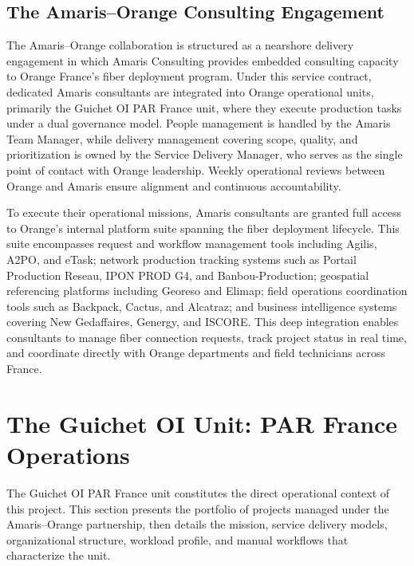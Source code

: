 \subsection{The Amaris--Orange Consulting Engagement}

The Amaris--Orange collaboration is structured as a nearshore delivery engagement in which Amaris Consulting provides embedded consulting capacity to Orange France's fiber deployment program. Under this service contract, dedicated Amaris consultants are integrated into Orange operational units, primarily the Guichet OI PAR France unit, where they execute production tasks under a dual governance model. People management is handled by the Amaris Team Manager, while delivery management covering scope, quality, and prioritization is owned by the Service Delivery Manager, who serves as the single point of contact with Orange leadership. Weekly operational reviews between Orange and Amaris ensure alignment and continuous accountability.

To execute their operational missions, Amaris consultants are granted full access to Orange's internal platform suite spanning the fiber deployment lifecycle. This suite encompasses request and workflow management tools including Agilis, A2PO, and eTask; network production tracking systems such as Portail Production Reseau, IPON PROD G4, and Banbou-Production; geospatial referencing platforms including Georeso and Elimap; field operations coordination tools such as Backpack, Cactus, and Alcatraz; and business intelligence systems covering New Gedaffaires, Genergy, and ISCORE. This deep integration enables consultants to manage fiber connection requests, track project status in real time, and coordinate directly with Orange departments and field technicians across France.

\section{The Guichet OI Unit: PAR France Operations}

The Guichet OI PAR France unit constitutes the direct operational context of this project. This section presents the portfolio of projects managed under the Amaris--Orange partnership, then details the mission, service delivery models, organizational structure, workload profile, and manual workflows that characterize the unit.


